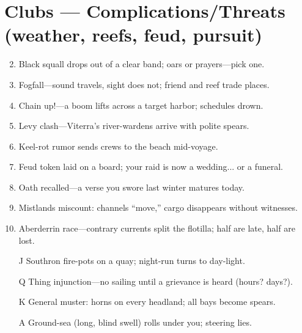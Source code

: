 \section*{Clubs --- Complications/Threats (weather, reefs, feud, pursuit)}
\label{sec:linn-complications}
\begin{enumerate}
\setcounter{enumi}{1}
\item Black squall drops out of a clear band; oars or prayers---pick one.
\item Fogfall---sound travels, sight does not; friend and reef trade places.
\item Chain up!---a boom lifts across a target harbor; schedules drown.
\item Levy clash---Viterra's river-wardens arrive with polite spears.
\item Keel-rot rumor sends crews to the beach mid-voyage.
\item Feud token laid on a board; your raid is now a wedding... or a funeral.
\item Oath recalled---a verse you swore last winter matures today.
\item Mistlands miscount: channels ``move,'' cargo disappears without witnesses.
\item Aberderrin race---contrary currents split the flotilla; half are late, half are lost.
\item[J] Southron fire-pots on a quay; night-run turns to day-light.
\item[Q] Thing injunction---no sailing until a grievance is heard (hours? days?).
\item[K] General muster: horns on every headland; all bays become spears.
\item[A] Ground-sea (long, blind swell) rolls under you; steering lies.
\end{enumerate}

